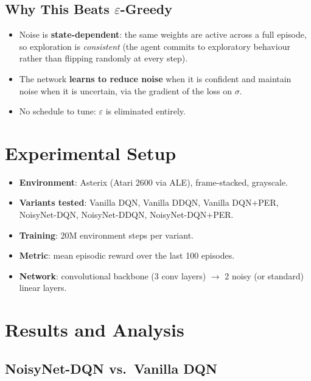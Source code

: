 \documentclass[12pt]{article}
\begin{document}
\subsection{Why This Beats $\varepsilon$-Greedy}

\begin{itemize}
  \item Noise is \textbf{state-dependent}: the same weights are active across a full episode,
        so exploration is \emph{consistent} (the agent commits to exploratory behaviour rather
        than flipping randomly at every step).
  \item The network \textbf{learns to reduce noise} when it is confident and maintain noise
        when it is uncertain, via the gradient of the loss on $\sigma$.
  \item No schedule to tune: $\varepsilon$ is eliminated entirely.
\end{itemize}

\section{Experimental Setup}

\begin{itemize}
  \item \textbf{Environment}: Asterix (Atari 2600 via ALE), frame-stacked, grayscale.
  \item \textbf{Variants tested}: Vanilla DQN, Vanilla DDQN, Vanilla DQN+PER,
        NoisyNet-DQN, NoisyNet-DDQN, NoisyNet-DQN+PER.
  \item \textbf{Training}: 20M environment steps per variant.
  \item \textbf{Metric}: mean episodic reward over the last 100 episodes.
  \item \textbf{Network}: convolutional backbone (3 conv layers) $\rightarrow$ 2 noisy
        (or standard) linear layers.
\end{itemize}

\section{Results and Analysis}

\subsection{NoisyNet-DQN vs.\ Vanilla DQN}
\end{document}
